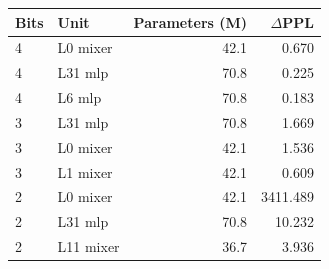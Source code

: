 \begin{tabular}{llrr}
\toprule
Bits & Unit & Parameters (M) & $\Delta$PPL \\
\midrule
4 & L0 mixer & 42.1 & 0.670 \\
4 & L31 mlp & 70.8 & 0.225 \\
4 & L6 mlp & 70.8 & 0.183 \\
\midrule
3 & L31 mlp & 70.8 & 1.669 \\
3 & L0 mixer & 42.1 & 1.536 \\
3 & L1 mixer & 42.1 & 0.609 \\
\midrule
2 & L0 mixer & 42.1 & 3411.489 \\
2 & L31 mlp & 70.8 & 10.232 \\
2 & L11 mixer & 36.7 & 3.936 \\
\bottomrule
\end{tabular}
